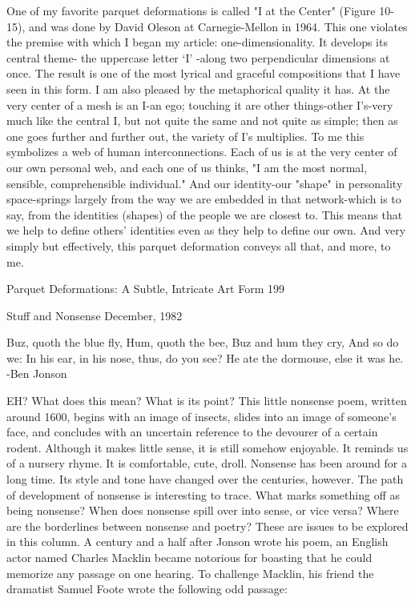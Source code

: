         One of my favorite parquet deformations is called "I at the Center" (Figure 10-
15), and was done by David Oleson at Carnegie-Mellon in 1964. This one violates the
premise with which I began my article: one-dimensionality. It develops its central theme-
the uppercase letter `I' -along two perpendicular dimensions at once. The result is one of
the most lyrical and graceful compositions that I have seen in this form.
        I am also pleased by the metaphorical quality it has. At the very center of a mesh
is an I-an ego; touching it are other things-other I's-very much like the central I, but not
quite the same and not quite as simple; then as one goes further and further out, the
variety of I's multiplies. To me this symbolizes a web of human interconnections. Each of
us is at the very center of our own personal web, and each one of us thinks, "I am the
most normal, sensible, comprehensible individual." And our identity-our "shape" in
personality space-springs largely from the way we are embedded in that network-which is
to say, from the identities (shapes) of the people we are closest to. This means that we
help to define others' identities even as they help to define our own. And very simply but
effectively, this parquet deformation conveys all that, and more, to me.




Parquet Deformations: A Subtle, Intricate Art Form                                         199


                             Stuff and Nonsense
                                    December, 1982

                                                    Buz, quoth the blue fly,
                                                    Hum, quoth the bee,
                                                     Buz and hum they cry,
                                                    And so do we:
                                                    In his ear, in his nose, thus, do you
                                                    see?
                                                    He ate the dormouse, else it was he.
                                                                              -Ben Jonson


EH? What does this mean? What is its point? This little nonsense poem, written
around 1600, begins with an image of insects, slides into an image of someone's face, and
concludes with an uncertain reference to the devourer of a certain rodent. Although it
makes little sense, it is still somehow enjoyable. It reminds us of a nursery rhyme. It is
comfortable, cute, droll.
       Nonsense has been around for a long time. Its style and tone have changed over
the centuries, however. The path of development of nonsense is interesting to trace. What
marks something off as being nonsense? When does nonsense spill over into sense, or
vice versa? Where are the borderlines between nonsense and poetry? These are issues to
be explored in this column.
       A century and a half after Jonson wrote his poem, an English actor named Charles
Macklin became notorious for boasting that he could memorize any passage on one
hearing. To challenge Macklin, his friend the dramatist Samuel Foote wrote the following
odd passage:

